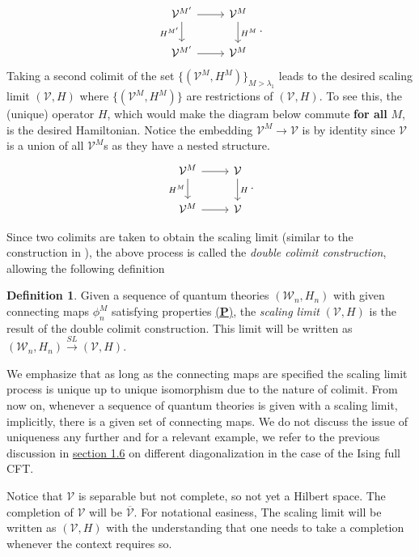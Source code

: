 \documentclass[twoside,11pt,titlepage]{amsart}
\renewcommand{\=}[1]{\stackrel{#1}{=}} %
\theoremstyle{definition}
\newtheorem{dfn}{Definition}
\theoremstyle{remark}
\begin{document}
\[ 
\begin{tikzcd}
\mathcal{V}^{M'} \arrow{r}{} \arrow[swap]{d}{H^{M'}} & \mathcal{V}^M \arrow{d}{H^M} \\
\mathcal{V}^{M'} \arrow{r}{}& \mathcal{V}^M
\end{tikzcd}.
\]
Taking a second colimit of the set $\{(\mathcal{V}^M,H^M)\}_{M > \lambda_1}$ leads to the desired scaling limit $(\mathcal{V},H)$ where $\{(\mathcal{V}^M,H^M)\}$ are restrictions of $(\mathcal{V},H)$. To see this, the (unique) operator $H$, which would make the diagram below commute \textbf{for all} $M$, is the desired Hamiltonian. Notice the embedding $\mathcal{V}^M \rightarrow \mathcal{V}$ is by identity since $\mathcal{V}$ is a union of all $\mathcal{V}^M$s as they have a nested structure.
    \[ 
    \begin{tikzcd}
    \mathcal{V}^{M} \arrow{r}{} \arrow[swap]{d}{H^{M}} & \mathcal{V} \arrow{d}{H} \\
    \mathcal{V}^{M} \arrow{r}{}& \mathcal{V}
    \end{tikzcd}.
    \]

Since two colimits are taken to obtain the scaling limit (similar to the construction in \cite[section 4.3]{gainutdinov2013continuum}), the above process is called the \textit{double colimit construction}, allowing the following definition
\begin{dfn}\label{dfn3}
Given a sequence of quantum theories $(\mathcal{W}_n,H_n)$ with given connecting maps $\phi_n^M$ satisfying properties \hyperref[P]{(\textbf{P})}, the \textit{scaling limit} $(\mathcal{V},H)$ is the result of the double colimit construction. This limit will be written as $(\mathcal{W}_n,H_n) \xrightarrow{SL} (\mathcal{V},H)$.
\end{dfn}

We emphasize that as long as the connecting maps are specified the scaling limit process is unique up to unique isomorphism due to the nature of colimit. From now on, whenever a sequence of quantum theories is given with a scaling limit, implicitly, there is a given set of connecting maps. We do not discuss the issue of uniqueness any further and for a relevant example, we refer to the previous discussion in \hyperref[1.6]{section 1.6} on different diagonalization in the case of the Ising full CFT.

Notice that $\mathcal{V}$ is separable but not complete, so not yet a Hilbert space. The completion of $\mathcal{V}$ will be $\overline{\mathcal{V}}$. For notational easiness, The scaling limit will be written as $(\mathcal{V},H)$ with the understanding that one needs to take a completion whenever the context requires so.
\end{document}
